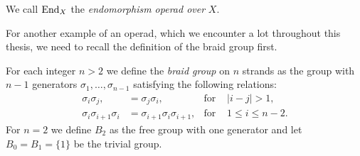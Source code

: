 \begin{egs}
\begin{enumerate}
            \begin{center}
            \end{center}
        
            We call $\operatorname{End}_X$ the {\em endomorphism operad over} $X$.

        \end{enumerate}
    \end{egs}

    For another example of an operad, which we encounter a lot throughout
    this thesis, we need to recall the definition of the braid group first.

    \begin{defin}
        For each integer $n > 2$ we define the {\em braid group} on $n$ strands
        as the group with $n-1$ generators $\sigma_1, \dots ,\sigma_{n-1}$
        satisfying the following relations:
        \begin{align*}
            \sigma_i \sigma_j, & = \sigma_j \sigma_i, & \text{for } &|i-j|>1,\\
            \sigma_i \sigma_{i+1} \sigma_i & = \sigma_{i+1} \sigma_i \sigma_{i+1}, & \text{for } &1 \leq i \leq n-2.
        \end{align*}
        For $n=2$ we define $B_2$ as the free group with one generator and let
        $B_0 = B_1 = \{1\}$ be the trivial group.
    \end{defin}

